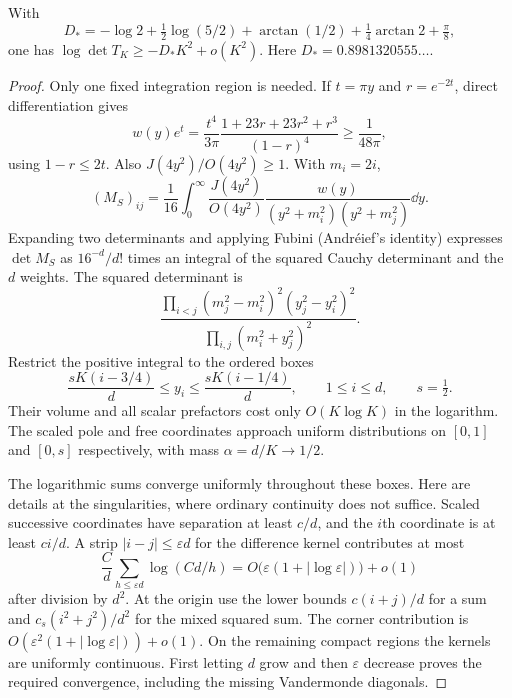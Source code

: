 \begin{lemma}\label{lem:gramlower}
With
\begin{equation}\label{eq:Dstar}
 D_*=-\log2+\tfrac12\log(5/2)+\arctan(1/2)
                  +\tfrac14\arctan2+\tfrac\pi8,
\end{equation}
one has $\log\det T_K\geq-D_*K^2+o(K^2)$.
Here $D_*=0.8981320555\ldots$.
\end{lemma}
\begin{proof}
Only one fixed integration region is needed. If $t=\pi y$ and
$r=e^{-2t}$, direct differentiation gives
\[
 w(y)e^t=\frac{t^4}{3\pi}
 \frac{1+23r+23r^2+r^3}{(1-r)^4}\geq\frac1{48\pi},
\]
using $1-r\leq2t$. Also $J(4y^2)/O(4y^2)\geq1$. With $m_i=2i$,
\[
 (M_S)_{ij}=\frac1{16}\int_0^\infty
 \frac{J(4y^2)}{O(4y^2)}
 \frac{w(y)}{(y^2+m_i^2)(y^2+m_j^2)}\dd y.
\]
Expanding two determinants and applying Fubini (Andr\'eief's identity)
expresses $\det M_S$ as $16^{-d}/d!$ times an integral of the squared
Cauchy determinant and the $d$ weights. The squared determinant is
\begin{equation}\label{eq:cauchy-square}
 \frac{\prod_{i<j}(m_j^2-m_i^2)^2(y_j^2-y_i^2)^2}
      {\prod_{i,j}(m_i^2+y_j^2)^2}.
\end{equation}
Restrict the positive integral to the ordered boxes
\[
 \frac{sK(i-3/4)}d\leq y_i\leq\frac{sK(i-1/4)}d,
 \qquad 1\leq i\leq d,\qquad s=\tfrac12.
\]
Their volume and all scalar prefactors cost only $O(K\log K)$ in
the logarithm. The scaled pole and free coordinates approach uniform
distributions on $[0,1]$ and $[0,s]$ respectively, with mass
$\alpha=d/K\longrightarrow1/2$.

The logarithmic sums converge uniformly throughout these boxes.
Here are details at the singularities, where ordinary continuity
does not suffice. Scaled successive coordinates have separation at
least $c/d$, and the $i$th coordinate is at least $ci/d$.
A strip $|i-j|\leq\varepsilon d$ for the difference kernel contributes
at most
\[
 \frac{C}{d}\sum_{h\leq\varepsilon d}\log(Cd/h)
 =O\bigl(\varepsilon(1+|\log\varepsilon|)\bigr)+o(1)
\]
after division by $d^2$. At the origin use the lower bounds
$c(i+j)/d$ for a sum and $c_s(i^2+j^2)/d^2$ for the mixed squared
sum. The corner contribution is
$O(\varepsilon^2(1+|\log\varepsilon|))+o(1)$.
On the remaining compact regions the kernels are uniformly continuous.
First letting $d$ grow and then $\varepsilon$ decrease proves the
required convergence, including the missing Vandermonde diagonals.


\end{proof}
